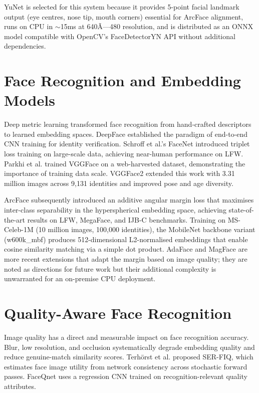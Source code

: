 \documentclass[12pt,a4paper]{report}
\begin{document}
YuNet is selected for this system because it provides 5-point facial landmark output (eye centres, nose tip, mouth corners) essential for ArcFace alignment, runs on CPU in $\sim$15ms at 640Ã—480 resolution, and is distributed as an ONNX model compatible with OpenCV's FaceDetectorYN API without additional dependencies.

\section{Face Recognition and Embedding Models}
Deep metric learning transformed face recognition from hand-crafted descriptors to learned embedding spaces. DeepFace \cite{sun2014deep} established the paradigm of end-to-end CNN training for identity verification. Schroff et al.'s FaceNet \cite{schroff2015facenet} introduced triplet loss training on large-scale data, achieving near-human performance on LFW. Parkhi et al. \cite{parkhi2015deep} trained VGGFace on a web-harvested dataset, demonstrating the importance of training data scale. VGGFace2 \cite{cao2018vggface2} extended this work with 3.31 million images across 9,131 identities and improved pose and age diversity.

ArcFace \cite{deng2019arcface} subsequently introduced an additive angular margin loss that maximises inter-class separability in the hyperspherical embedding space, achieving state-of-the-art results on LFW, MegaFace, and IJB-C benchmarks. Training on MS-Celeb-1M \cite{guo2016msceleb} (10 million images, 100,000 identities), the MobileNet backbone variant (w600k\_mbf) produces 512-dimensional L2-normalised embeddings that enable cosine similarity matching via a simple dot product. AdaFace \cite{kim2022adaface} and MagFace \cite{meng2021magface} are more recent extensions that adapt the margin based on image quality; they are noted as directions for future work but their additional complexity is unwarranted for an on-premise CPU deployment.

\section{Quality-Aware Face Recognition}
Image quality has a direct and measurable impact on face recognition accuracy. Blur, low resolution, and occlusion systematically degrade embedding quality and reduce genuine-match similarity scores. Terh{\"o}rst et al. \cite{terhorst2020ser} proposed SER-FIQ, which estimates face image utility from network consistency across stochastic forward passes. FaceQnet \cite{hernandez2019faceqnet} uses a regression CNN trained on recognition-relevant quality attributes.
\end{document}
